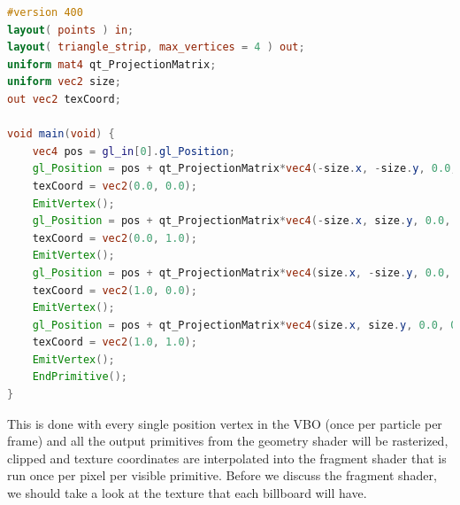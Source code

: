 \begin{lstlisting}[caption=billboardGeometryShader.glsl, label=lst:simplegeometryshaderbillboard, language=GLSL]
#version 400
layout( points ) in;
layout( triangle_strip, max_vertices = 4 ) out;
uniform mat4 qt_ProjectionMatrix;
uniform vec2 size;
out vec2 texCoord;

void main(void) {
    vec4 pos = gl_in[0].gl_Position;
    gl_Position = pos + qt_ProjectionMatrix*vec4(-size.x, -size.y, 0.0, 0.0);
    texCoord = vec2(0.0, 0.0);
    EmitVertex();
    gl_Position = pos + qt_ProjectionMatrix*vec4(-size.x, size.y, 0.0, 0.0);
    texCoord = vec2(0.0, 1.0);
    EmitVertex();
    gl_Position = pos + qt_ProjectionMatrix*vec4(size.x, -size.y, 0.0, 0.0);
    texCoord = vec2(1.0, 0.0);
    EmitVertex();
    gl_Position = pos + qt_ProjectionMatrix*vec4(size.x, size.y, 0.0, 0.0);
    texCoord = vec2(1.0, 1.0);
    EmitVertex();
    EndPrimitive();
}
\end{lstlisting}
This is done with every single position vertex in the VBO (once per particle per frame) and all the output primitives from the geometry shader will be rasterized, clipped and texture coordinates are interpolated into the fragment shader that is run once per pixel per visible primitive. Before we discuss the fragment shader, we should take a look at the texture that each billboard will have.

